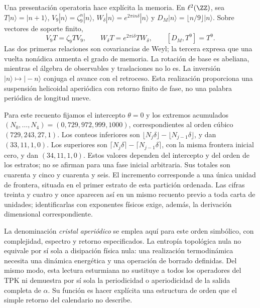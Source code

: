 Una presentación operatoria hace explícita la memoria. En \(\ell^2(\ZZ)\), sea \(T|n\rangle=|n+1\rangle\), \(V_9|n\rangle=\zeta_9^n|n\rangle\), \(W_\delta|n\rangle=e^{2\pi i n\delta}|n\rangle\) y \(D_M|n\rangle=\lfloor n/9\rfloor|n\rangle\). Sobre vectores de soporte finito,
\begin{equation}
 V_9T=\zeta_9TV_9,\qquad
 W_\delta T=e^{2\pi i\delta}TW_\delta,\qquad
 [D_M,T^9]=T^9.
 \label{eq:weyl-relojes}
\end{equation}
Las dos primeras relaciones son covariancias de Weyl; la tercera expresa que una vuelta nonádica aumenta el grado de memoria. La rotación de base es abeliana, mientras el álgebra de observables y traslaciones no lo es. La inversión \(|n\rangle\mapsto|-n\rangle\) conjuga el avance con el retroceso. Esta realización proporciona una suspensión helicoidal aperiódica con retorno finito de fase, no una palabra periódica de longitud nueve.



Para este recuento fijamos el intercepto \(\theta=0\) y los extremos acumulados \((N_0,\ldots,N_4)=(0,729,972,999,1000)\), correspondientes al orden cúbico \((729,243,27,1)\). Los conteos inferiores son \(\lfloor N_j\delta\rfloor-\lfloor N_{j-1}\delta\rfloor\), y dan \((33,11,1,0)\). Los superiores son \(\lceil N_j\delta\rceil-\lceil N_{j-1}\delta\rceil\), con la misma frontera inicial cero, y dan \((34,11,1,0)\). Estos valores dependen del intercepto y del orden de los estratos; no se afirman para una fase inicial arbitraria. Sus totales son cuarenta y cinco y cuarenta y seis. El incremento corresponde a una única unidad de frontera, situada en el primer estrato de esta partición ordenada. Las cifras treinta y cuatro y once aparecen así en un mismo recuento previo a toda carta de unidades; identificarlas con exponentes físicos exige, además, la derivación dimensional correspondiente.

La denominación \emph{cristal aperiódico} se emplea aquí para este orden simbólico, con complejidad, espectro y retorno especificados. La entropía topológica nula no equivale por sí sola a disipación física nula: una realización termodinámica necesita una dinámica energética y una operación de borrado definidas. Del mismo modo, esta lectura esturmiana no sustituye a todos los operadores del TPK ni demuestra por sí sola la periodicidad o aperiodicidad de la salida completa de \(\alpha\). Su función es hacer explícita una estructura de orden que el simple retorno del calendario no describe.


